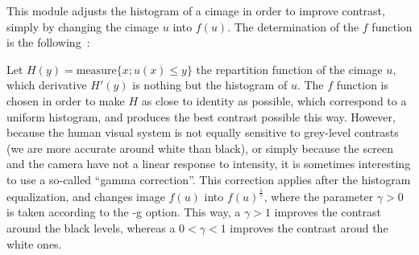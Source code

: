 This module adjusts the histogram of a cimage in order to improve contrast, simply by changing the cimage $u$ into $f(u)$. The determination of the $f$ function is the following~:

Let $H(y)= \mathrm{measure} \{ x; u(x)\leq y \}$ the repartition function of the cimage $u$, which derivative $H'(y)$ is nothing but the histogram of $u$. The $f$ function is chosen in order to make $H$ as close to identity as possible, which correspond to a uniform histogram, and produces the best contrast possible this way. However, because the human visual system is not equally sensitive to grey-level contrasts (we are more accurate around white than black), or simply because the screen and the camera have not a linear response to intensity, it is sometimes interesting to use a so-called ``gamma correction''. This correction applies after the histogram equalization, and changes image $f(u)$ into $f(u)^\frac{1}{\gamma}$, where the parameter $\gamma>0$ is taken according to the -g option. This way, a $\gamma>1$ improves the contrast around the black levels, whereas a $0<\gamma<1$ improves the contrast aroud the white ones. 

